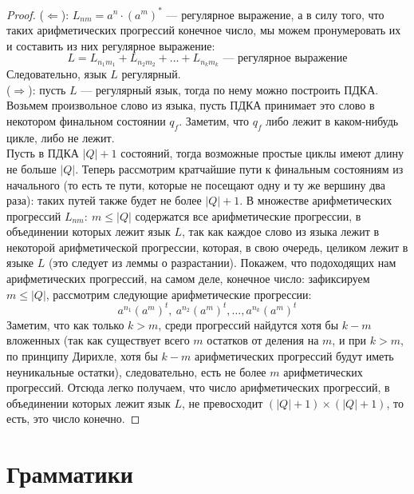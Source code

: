 \documentclass[11pt]{article}
\begin{document}
\begin{proof}
    ($\Longleftarrow$): $L_{nm} = a^n \cdot (a^m)^*$ --- регулярное выражение, а в силу того, что таких арифметических прогрессий конечное число, мы можем пронумеровать их 
    и составить из них регулярное выражение: \[L = L_{n_1 m_1} + L_{n_2 m_2} + \dots + L_{n_k m_k} \text{ --- регулярное выражение}\] Следовательно, язык $L$ регулярный.\\
    \leavevmode
    ($\Longrightarrow$): пусть $L$ --- регулярный язык, тогда по нему можно построить ПДКА. Возьмем произвольное слово из языка, пусть ПДКА принимает это слово в некотором
    финальном состоянии $q_f$. Заметим, что $q_f$ либо лежит в каком-нибудь цикле, либо не лежит.\\
    Пусть в ПДКА $\left|Q\right| + 1$ состояний, тогда возможные простые циклы имеют длину не больше $\left|Q\right|$. Теперь рассмотрим кратчайшие пути к финальным состояниям
    из начального (то есть те пути, которые не посещают одну и ту же вершину два раза): таких путей также будет не более $\left|Q\right| + 1$. В множестве арифметических прогрессий
    $L_{nm}: \ m \leq \left|Q\right|$ содержатся все арифметические прогрессии, в объединении которых лежит язык $L$, так как каждое слово из языка лежит в некоторой 
    арифметической прогрессии, которая, в свою очередь, целиком лежит в языке $L$ (это следует из леммы о разрастании). Покажем, что подоходящих нам арифметических прогрессий,
    на самом деле, конечное число: зафиксируем $m \leq \left|Q\right|$, рассмотрим следующие арифметические прогрессии: \[a^{n_1} (a^m)^t, \ a^{n_2} (a^m)^t, \dots, a^{n_k} (a^m)^t\]
    Заметим, что как только $k > m$, среди прогрессий найдутся хотя бы $k-m$ вложенных (так как существует всего $m$ остатков от деления на $m$, и при $k > m$, по принципу Дирихле, хотя бы 
    $k - m$ арифметических прогрессий будут иметь неуникальные остатки), следовательно, есть не более $m$ арифметических прогрессий. Отсюда легко получаем, что число арифметических 
    прогрессий, в объединении которых лежит язык $L$, не превосходит $(\left|Q\right| + 1) \times (\left|Q\right| + 1)$, то есть, это число конечно.

\end{proof}

\section{Грамматики}
\end{document}
